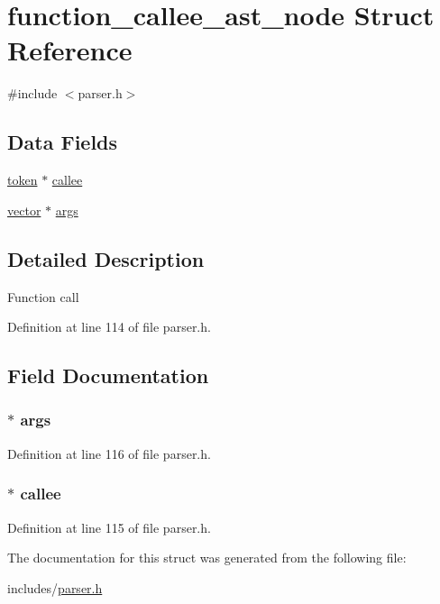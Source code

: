 \hypertarget{structfunction__callee__ast__node}{\section{function\+\_\+callee\+\_\+ast\+\_\+node Struct Reference}
\label{structfunction__callee__ast__node}
}


{\ttfamily \#include $<$parser.\+h$>$}

\subsection*{Data Fields}
\begin{DoxyCompactItemize}
\item 
\hyperlink{structtoken}{token} $\ast$ \hyperlink{structfunction__callee__ast__node_a6575fd3f3ec6e53f0247c4d4f6c3360c}{callee}
\item 
\hyperlink{structvector}{vector} $\ast$ \hyperlink{structfunction__callee__ast__node_ac72a099d63034430cf03119307318f8f}{args}
\end{DoxyCompactItemize}


\subsection{Detailed Description}
Function call 

Definition at line 114 of file parser.\+h.



\subsection{Field Documentation}
\hypertarget{structfunction__callee__ast__node_ac72a099d63034430cf03119307318f8f}{
\subsubsection[{args}]{$\ast$ args}}\label{structfunction__callee__ast__node_ac72a099d63034430cf03119307318f8f}


Definition at line 116 of file parser.\+h.

\hypertarget{structfunction__callee__ast__node_a6575fd3f3ec6e53f0247c4d4f6c3360c}{
\subsubsection[{callee}]{$\ast$ callee}}\label{structfunction__callee__ast__node_a6575fd3f3ec6e53f0247c4d4f6c3360c}


Definition at line 115 of file parser.\+h.



The documentation for this struct was generated from the following file\+:\begin{DoxyCompactItemize}
\item 
includes/\hyperlink{parser_8h}{parser.\+h}\end{DoxyCompactItemize}
